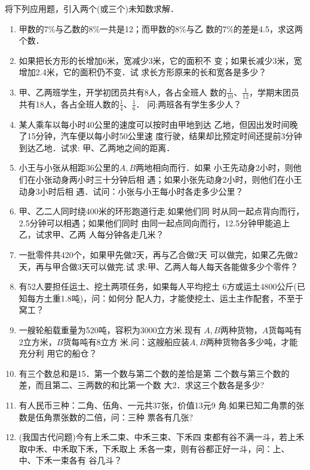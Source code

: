 将下列应用题，引入两个(或三个)未知数求解．

\begin{enumerate}
    \item  甲数的7\%与乙数的8\%一共是12；而甲数的8\%与乙
    数的7\%的差是4.5，求这两个数．
    \item 如果把长方形的长增加6米，宽减少3米，它的面积不
    变；如果长减少3米，宽增加2.4米，它的面积仍不变．试
    求长方形原来的长和宽各是多少？
    \item 甲、乙两班学生，开学初团员共有8人，各占全班人
    数的$\frac{1}{10}$、$\frac{1}{12}$，学期末团员共有18人，各占全班人数的$\frac{1}{4}$、$\frac{1}{6}$．
    问:两班各有学生多少人？
    \item 某人乘车以每小时40公里的速度可以按时由甲地到达
    乙地，但因出发时间晚了15分钟，汽车便以每小时50公里速
    度行驶，结果却比预定时间还提前3分钟到达乙地．试求:
    甲、乙两地之间的距离．
    \item 小王与小张从相距36公里的$A, B$两地相向而行．如果
    小王先动身2小时，则他们在小张动身两小时三十分钟后相
    遇；如果小张先动身2小时，则他们在小王动身3小时后相
    遇．试问：小张与小王每小时各走多少公里？
    \item 甲、乙二人同时绕400米的环形跑道行走.如果他们同
    时从同一起点背向而行，2.5分钟可以相遇；如果他们同时
    由同一起点同向而行，12.5分钟甲能追上乙，试求甲、乙两
    人每分钟各走几米？
    \item 一批零件共420个，如果甲先做2天，再与乙合做2天
    可以做完，如果乙先做2天，再与甲合做3天可以做完.试
    求:甲、乙两人每人每天各能做多少个零件？
    \item 有52人要担任运土、挖土两项任务，如果每人平均挖土
    6方或运土4800公斤(已知每方土重1.8吨)，问：如何分
    配人力，才能使挖土、运土主作配套，不至于窝工？
    \item 一艘轮船载重量为520吨，容积为3000立方米.现有
    $A, B$两种货物，$A$货每吨有2立方米，$B$货每吨有8立方
    米.问：这艘船应装$A, B$两种货物各多少吨，才能充分利
    用它的船仓？
    \item 有三个数总和是15．第一个数与第二个数的差恰是第
    二个数与第三个数的差，而且第二、三两数的和比第一个数
    大2．求这三个数各是多少?
    \item 有人民币三种：二角、伍角、一元共37张，价值13元9
    角.如果已知二角票的张数是伍角票张数的二倍，问：三种
    票各有几张?
    \item (我国古代问题)今有上禾二束、中禾三束、下禾四
    束都有谷不满一斗，若上禾取中禾、中禾取下禾，下禾取上
    禾各一束，则有谷都正好一斗，问：上、中、下禾一束各有
    谷几斗？
    
\end{enumerate}


